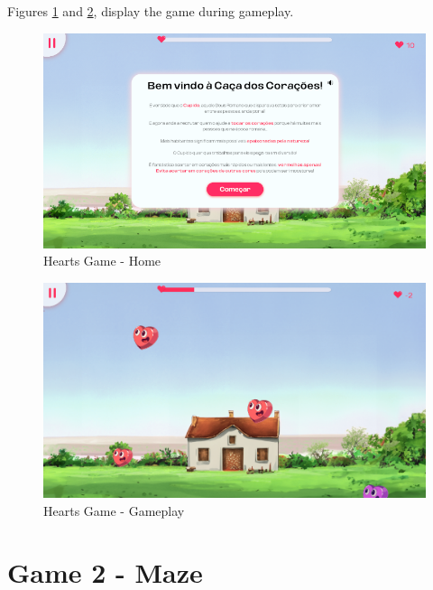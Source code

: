 

Figures \ref{fig:heartsHome} and \ref{fig:heartsGameplay}, display the game during gameplay.

\begin{figure}[H]
    \centering
    \includegraphics[width=0.9\linewidth]{Chapters/gameplay/new_screens/hearts_home.png}
    \caption{Hearts Game - Home}
    \label{fig:heartsHome}    
\end{figure}

\begin{figure}[H]
    \centering
    \includegraphics[width=0.9\linewidth]{Chapters/gameplay/HeartsGame.png}
    \caption{Hearts Game - Gameplay}
    \label{fig:heartsGameplay}    
\end{figure}


\section{Game 2 - Maze}
\label{c3Maze}


